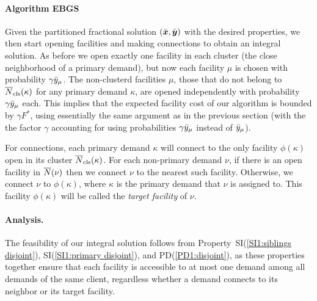 \documentclass[11pt]{article}
\begin{document}
\paragraph{Algorithm EBGS}
Given the partitioned fractional solution $(\bar{\boldsymbol{x}},
\bar{\boldsymbol{y}})$ with the desired properties, we then start opening
facilities and making connections to obtain an integral
solution. As before we open exactly one facility in each
cluster (the close neighborhood of a primary demand), but
now each facility $\mu$ is chosen with probability
$\gamma{\bar y}_{\mu}$. The non-clusterd facilities $\mu$,
those that do not belong to ${\overline{N}}_{\text{cls}}(\kappa)$ for any
primary demand $\kappa$, are opened independently with
probability $\gamma{\bar y}_{\mu}$ each. This implies that the
expected facility cost of our algorithm is bounded by
$\gamma F^\ast$, using essentially the same argument as in
the previous section (with the the factor $\gamma$
accounting for using probabilities $\gamma {\bar y}_{\mu}$
instead of ${\bar y}_{\mu}$).

For connections, each primary demand $\kappa$ will connect
to the only facility $\phi(\kappa)$ open in its cluster
${\overline{N}}_{\text{cls}}(\kappa)$.  For each non-primary demand $\nu$, if
there is an open facility in ${\overline{N}}(\nu)$ then we connect
$\nu$ to the nearest such facility. Otherwise, we connect
$\nu$ to $\phi(\kappa)$, where $\kappa$ is the primary
demand that $\nu$ is assigned to. This facility
$\phi(\kappa)$ will be called the \emph{target facility} of
$\nu$.


\paragraph{Analysis.}
The feasibility of our integral solution follows from
Property~SI(\ref{SI1:siblings disjoint}),
SI(\ref{SI1:primary disjoint}), and PD(\ref{PD1:disjoint}),
as these properties together ensure that each facility is
accessible to at most one demand among all demands of the
same client, regardless whether a demand connects to its
neighbor or its target facility.
\end{document}
